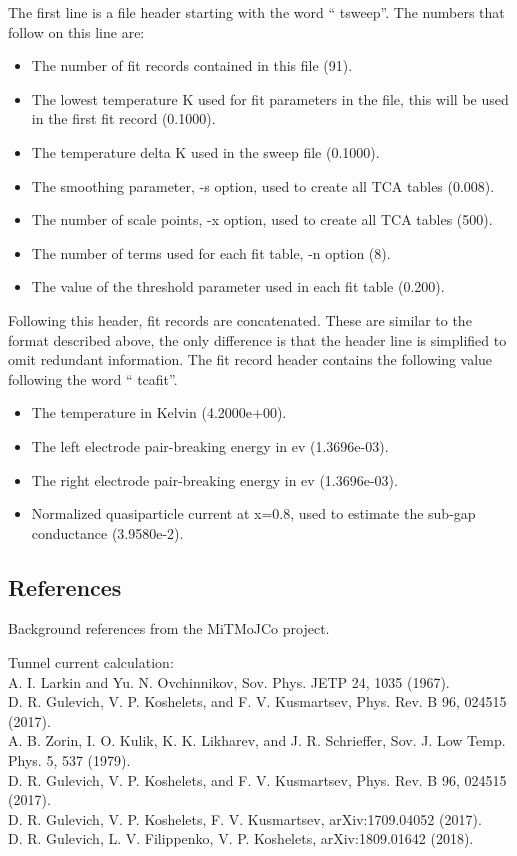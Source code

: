 The first line is a file header starting with the word ``{\vt
tsweep}''.  The numbers that follow on this line are:

\begin{itemize}
\item{The number of fit records contained in this file (91).}
\item{The lowest temperature K used for fit parameters in the file,
this will be used in the first fit record (0.1000).}
\item{The temperature delta K used in the sweep file (0.1000).}
\item{The smoothing parameter, {\vt -s} option, used to create all TCA
tables (0.008).}
\item{The number of scale points, {\vt -x} option, used to create all
TCA tables (500).}
\item{The number of terms used for each fit table, {\vt -n} option
(8).}
\item{The value of the threshold parameter used in each fit table
(0.200).}
\end{itemize}

Following this header, fit records are concatenated.  These are
similar to the format described above, the only difference is that the
header line is simplified to omit redundant information.  The fit
record header contains the following value following the word ``{\vt
tcafit}''.

\begin{itemize}
\item{The temperature in Kelvin (4.2000e+00).}
\item{The left electrode pair-breaking energy in ev (1.3696e-03).}
\item{The right electrode pair-breaking energy in ev (1.3696e-03).}
\item{Normalized quasiparticle current at x=0.8, used to estimate
the sub-gap conductance (3.9580e-2).}
\end{itemize}


\subsection{References}

Background references from the MiTMoJCo project.

Tunnel current calculation:\\
A. I. Larkin and Yu. N. Ovchinnikov, Sov. Phys. JETP 24, 1035 (1967).\\
D. R. Gulevich, V. P. Koshelets, and F. V. Kusmartsev, Phys. Rev. B 96,
 024515 (2017).\\
A. B. Zorin, I. O. Kulik, K. K. Likharev, and J. R. Schrieffer, Sov. J. 
 Low Temp. Phys. 5, 537 (1979).\\
D. R. Gulevich, V. P. Koshelets, and F. V. Kusmartsev, Phys.  Rev. B 96,
 024515 (2017).\\
D. R. Gulevich, V. P. Koshelets, F. V. Kusmartsev, arXiv:1709.04052 (2017).\\
D. R. Gulevich, L. V. Filippenko, V. P. Koshelets, arXiv:1809.01642 (2018).\\

